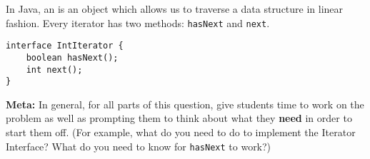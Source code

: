In Java, an  is an object which allows us to traverse a data
structure in linear fashion. Every iterator has two methods:
\lstinline$hasNext$ and \lstinline$next$.

\begin{lstlisting}
interface IntIterator {
    boolean hasNext();
    int next();
}
\end{lstlisting}

\begin{solution}
\textbf{Meta:} In general, for all parts of this question, give students time
to work on the problem as well as prompting them to think about what they
\textbf{need} in order to start them off. (For example, what do you need to do
to implement the Iterator Interface? What do you need to know for
\lstinline$hasNext$ to work?)
\end{solution}

